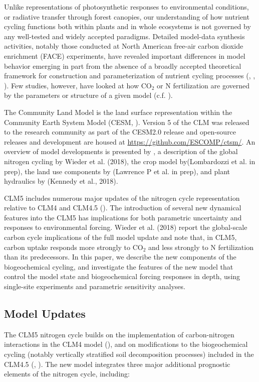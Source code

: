\documentclass[draft,linenumbers]{agujournal}
\begin{document}
Unlike representations of photosynthetic responses to environmental conditions, or radiative transfer through forest canopies, our understanding of how nutrient cycling functions both within plants and in whole ecosystems is not governed by any well-tested and widely accepted paradigms. Detailed model-data synthesis activities, notably those conducted at North American free-air carbon dioxide enrichment (FACE) experiments, have revealed important differences in model behavior emerging in part from the absence of a broadly accepted theoretical framework for construction and parameterization of nutrient cycling processes (\cite{kauwe2013}, \cite{zaehle2014}, \cite{medlyn2015}). Few studies, however, have looked at how CO$_{2}$ or N fertilization are governed by the parameters or structure of a given model (c.f. \cite{meyerholt2018}).

The Community Land Model is the land surface representation within the Community Earth System Model (CESM, \cite{hurrell2013}). Version 5 of the CLM was released to the research community as part of the CESM2.0 release and open-source releases and development are housed at \url{https://github.com/ESCOMP/ctsm/}. An overview of model developments is presented by \cite{lawrence2018}, a description of the global nitrogen cycling by Wieder et al. (2018), the crop model by(Lombardozzi et al. in prep), the land use components by (Lawrence P et al. in prep), and plant hydraulics by (Kennedy et al., 2018).

CLM5 includes numerous major updates of the nitrogen cycle representation relative to CLM4 and CLM4.5 (\cite{lawrence2011}). The introduction of several new dynamical features into the CLM5 has implications for both parametric uncertainty and responses to environmental forcing. Wieder et al. (2018) report the global-scale carbon cycle implications of the full model update and note that, in CLM5, carbon uptake responds more strongly to CO$_{2}$ and less strongly to N fertilization than its predecessors.  In this paper, we describe the new components of the biogeochemical cycling, and investigate the features of the new model that control the model state and biogeochemical forcing responses in depth, using single-site experiments and parametric sensitivity analyses. 

\subsection{Model Updates}
The CLM5 nitrogen cycle builds on the implementation of carbon-nitrogen interactions in the CLM4 model (\cite{thornton2007}), and on modifications to the biogeochemical cycling (notably vertically stratified soil decomposition processes) included in the CLM4.5 (\cite{koven2013}, \cite{bonan2012}). The new model integrates three major additional prognostic elements of the nitrogen cycle, including:\\
\end{document}
